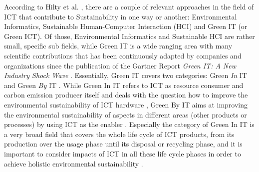 \documentclass[oribibl]{llncs}
\begin{document}
According to Hilty et al. \cite{hilty11}, there are a couple of relevant approaches in the field of ICT that contribute to Sustainability in one way or another: Environmental Informatics, Sustainable Human-Computer Interaction (HCI) and Green IT (or Green ICT). Of those, Environmental Informatics and Sustainable HCI are rather small, specific sub fields, while Green IT is a wide ranging area with many scientific contributions that has been continuously adapted by companies and organizations %
since the publication of the Gartner Report \textit{Green IT: A New Industry Shock Wave} \cite{gartner07}. %
Essentially, Green IT covers two categories: Green \textit{In} IT and Green \textit{By} IT \cite{hilty11}. While Green In IT refers to ICT as resource consumer and carbon emission producer itself and deals with the question how to improve the environmental sustainability of ICT hardware \cite{calero_green_2015}, Green By IT aims at improving the environmental sustainability of aspects in different areas (other products or processes) by using ICT as the enabler \cite{hilty11}. Especially the category of Green In IT is a very broad field that covers the whole life cycle of ICT products, from its production over the usage phase until its disposal or recycling phase, and it is important to consider impacts of ICT in all these life cycle phases in order to achieve holistic environmental sustainability \cite{hilty11}. %
\end{document}
